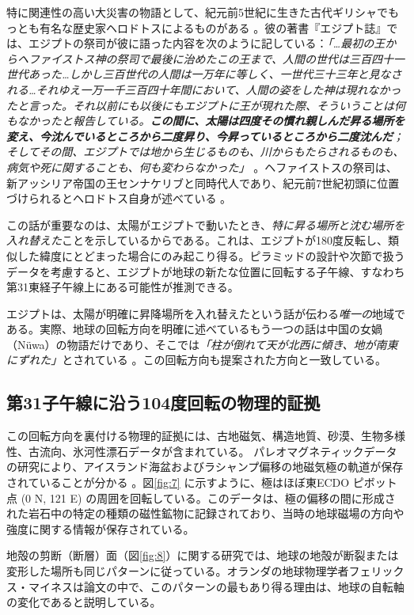 \documentclass[10pt,twocolumn,letterpaper]{article}
\begin{document}
特に関連性の高い大災害の物語として、紀元前5世紀に生きた古代ギリシャでもっとも有名な歴史家ヘロドトスによるものがある \cite{31}。彼の著書『エジプト誌』では、エジプトの祭司が彼に語った内容を次のように記している：\textit{「…最初の王からヘファイストス神の祭司で最後に治めたこの王まで、人間の世代は三百四十一世代あった…しかし三百世代の人間は一万年に等しく、一世代三十三年と見なされる…それゆえ一万一千三百四十年間において、人間の姿をした神は現れなかったと言った。それ以前にも以後にもエジプトに王が現れた際、そういうことは何もなかったと報告している。\textbf{この間に、太陽は四度その慣れ親しんだ昇る場所を変え、今沈んでいるところから二度昇り、今昇っているところから二度沈んだ}；そしてその間、エジプトでは地から生じるものも、川からもたらされるものも、病気や死に関することも、何も変わらなかった」} \cite{32}。ヘファイストスの祭司は、新アッシリア帝国の王センナケリブと同時代人であり、紀元前7世紀初頭に位置づけられるとヘロドトス自身が述べている \cite{32,33,34}。

この話が重要なのは、太陽がエジプトで動いたとき、\textit{特に昇る場所と沈む場所を入れ替えた}ことを示しているからである。これは、エジプトが180度反転し、類似した緯度にとどまった場合にのみ起こり得る。ピラミッドの設計や次節で扱うデータを考慮すると、エジプトが地球の新たな位置に回転する子午線、すなわち第31東経子午線上にある可能性が推測できる。

エジプトは、太陽が明確に昇降場所を入れ替えたという話が伝わる\textit{唯一の}地域である。実際、地球の回転方向を明確に述べているもう一つの話は中国の女媧（Nüwa）の物語だけであり、そこでは\textit{「柱が倒れて天が北西に傾き、地が南東にずれた」}とされている \cite{8}。この回転方向も提案された方向と一致している。

\subsection{第31子午線に沿う104度回転の物理的証拠}

この回転方向を裏付ける物理的証拠には、古地磁気、構造地質、砂漠、生物多様性、古流向、氷河性漂石データが含まれている。
パレオマグネティックデータの研究により、アイスランド海盆およびラシャンプ偏移の地磁気極の軌道が保存されていることが分かる \cite{35}。図\ref{fig:7} に示すように、極はほぼ東ECDO ピボット点 (0 N, 121 E) の周囲を回転している。このデータは、極の偏移の間に形成された岩石中の特定の種類の磁性鉱物に記録されており、当時の地球磁場の方向や強度に関する情報が保存されている。

地殻の剪断（断層）面（図\ref{fig:8}）に関する研究では、地球の地殻が断裂または変形した場所も同じパターンに従っている。オランダの地球物理学者フェリックス・マイネスは論文\cite{36}の中で、このパターンの最もあり得る理由は、地球の自転軸の変化であると説明している。
\end{document}
